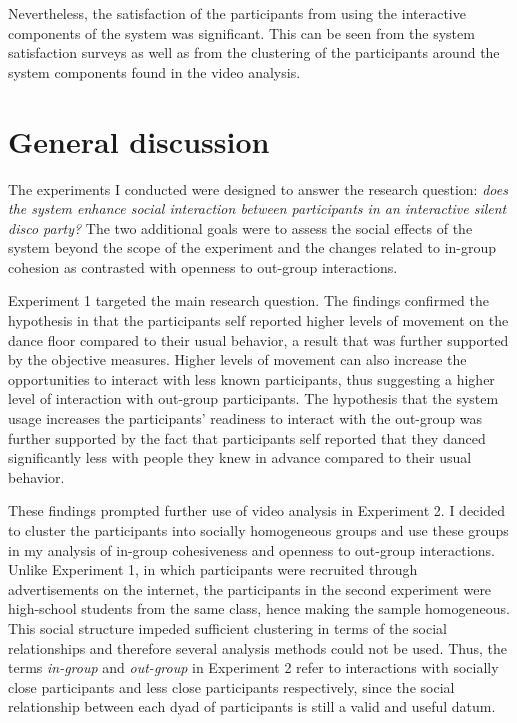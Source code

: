 \documentclass[a4paper,11pt]{article}
\newcommand{\definition}[1]{\emph{#1}}
\begin{document}
{Nevertheless, the satisfaction of the participants from using the interactive components of the system was significant.
This can be seen from the system satisfaction surveys as well as from the clustering of the participants around the system components found in the video analysis.

\clearpage\section{General discussion}

The experiments I conducted were designed to answer the research question: \emph{does the system enhance social interaction between participants in an interactive silent disco party?}
The two additional goals were to assess the social effects of the system beyond the scope of the experiment and the changes related to in-group cohesion as contrasted with openness to out-group interactions.

Experiment 1 targeted the main research question.
The findings confirmed the hypothesis in that the participants self reported higher levels of movement on the dance floor compared to their usual behavior, a result that was further supported by the objective measures.
Higher levels of movement can also increase the opportunities to interact with less known participants, thus suggesting a higher level of interaction with out-group participants.
The hypothesis that the system usage increases the participants' readiness to interact with the out-group was further supported by the fact that participants self reported that they danced significantly less with people they knew in advance compared to their usual behavior.

These findings prompted further use of video analysis in Experiment 2.
I decided to cluster the participants into socially homogeneous groups and use these groups in my analysis of in-group cohesiveness and openness to out-group interactions.
Unlike Experiment 1, in which participants were recruited through advertisements on the internet, the participants in the second experiment were high-school students from the same class, hence making the sample homogeneous.
This social structure impeded sufficient clustering in terms of the social relationships and therefore several analysis methods could not be used.
Thus, the terms \definition{in-group} and \definition{out-group} in Experiment 2 refer to interactions with socially close participants and less close participants respectively, since the social relationship between each dyad of participants is still a valid and useful datum.

}
\end{document}
